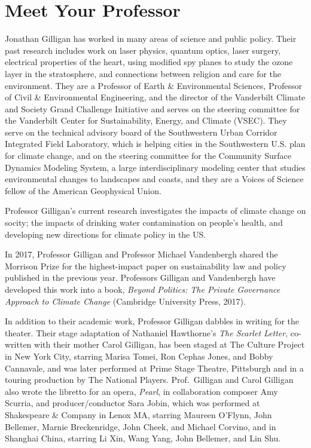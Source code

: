 \clearpage
\section{Meet Your Professor}
Jonathan Gilligan has worked in many areas of science and public policy.
Their past research includes work on laser physics, quantum optics,
laser surgery, electrical properties of the heart, using modified spy planes to
study the ozone layer in the stratosphere, and connections between religion and
care for the environment.
They are a Professor of Earth \& Environmental Sciences,
Professor of Civil \& Environmental Engineering,
and the director of the Vanderbilt Climate and Society Grand Challenge
Initiative and serves on the steering committee for the Vanderbilt Center for
Sustainability, Energy, and Climate (VSEC).
They serve on the technical advisory board of the
Southwestern Urban Corridor Integrated Field Laboratory, which is helping cities
in the Southwestern U.S. plan for climate change,
and on the steering committee for the
Community Surface Dynamics Modeling System, a large interdisciplinary modeling
center that studies environmental changes to landscapes and coasts, and they
are a Voices of Science fellow of the American Geophysical Union.
\iffalse

Professor Gilligan joined the Vanderbilt Faculty in 1994 as a member of the
Department of Physics and Astronomy. In 2003, when the Department of Geology
became the Department of Earth and Environmental Science, Professor Gilligan
joined the new department to focus on atmospheric science, global climate change,
and the interactions of politics, ethics, religion, communication, and the
environment.
\fi

Professor Gilligan's current research investigates
the impacts of climate change on socity;
the impacts of drinking water contamination on people's health,
and developing new directions for climate policy in the US.

In 2017, Professor Gilligan and Professor Michael Vandenbergh shared
the Morrison Prize for the highest-impact paper on sustainability law and
policy published in the previous year. Professors Gilligan and Vandenbergh
have developed this work into a book,
\emph{Beyond Politics: The Private Governance Approach to Climate Change\/}
(Cambridge University Press, 2017).

In addition to their academic work, Professor Gilligan dabbles in writing for
the theater. Their stage adaptation of Nathaniel Hawthorne's
\emph{The Scarlet Letter},
co-written with their mother Carol Gilligan, has been staged at The Culture
Project in New York City, starring
Marisa Tomei, Ron Cephas Jones, and Bobby Cannavale, and was later performed
at Prime Stage Theatre, Pittsburgh and in a touring production by The National
Players.
Prof.\ Gilligan and Carol Gilligan also wrote the libretto for an opera,
\emph{Pearl}, in collaboration composer Amy Scurria, and producer/conductor
Sara Jobin, which was performed at Shakespeare \& Company in Lenox MA,
starring Maureen O'Flynn, John Bellemer, Marnie Breckenridge, John Cheek,
and Michael Corvino, and in Shanghai China,
starring Li Xin, Wang Yang, John Bellemer, and Lin Shu.
